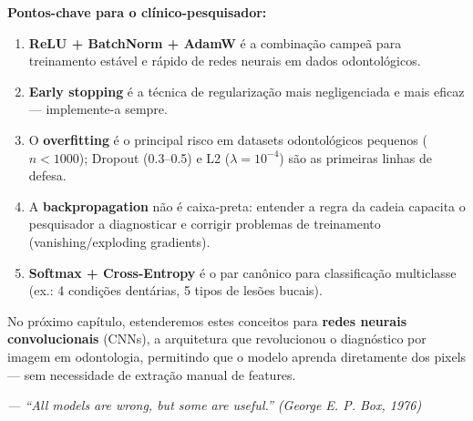 \textbf{Pontos-chave para o clínico-pesquisador:}
\begin{enumerate}
  \item \textbf{ReLU + BatchNorm + AdamW} é a combinação campeã para treinamento
        estável e rápido de redes neurais em dados odontológicos.
  \item \textbf{Early stopping} é a técnica de regularização mais negligenciada
        e mais eficaz --- implemente-a sempre.
  \item O \textbf{overfitting} é o principal risco em datasets odontológicos
        pequenos ($n < 1000$); Dropout (0.3--0.5) e L2 ($\lambda=10^{-4}$)
        são as primeiras linhas de defesa.
  \item A \textbf{backpropagation} não é caixa-preta: entender a regra da cadeia
        capacita o pesquisador a diagnosticar e corrigir problemas de treinamento
        (vanishing/exploding gradients).
  \item \textbf{Softmax + Cross-Entropy} é o par canônico para classificação
        multiclasse (ex.: 4 condições dentárias, 5 tipos de lesões bucais).
\end{enumerate}

No próximo capítulo, estenderemos estes conceitos para \textbf{redes neurais
convolucionais} (CNNs), a arquitetura que revolucionou o diagnóstico por imagem
em odontologia, permitindo que o modelo aprenda diretamente dos pixels --- sem
necessidade de extração manual de features.

\begin{flushright}
\itshape\small
--- ``All models are wrong, but some are useful.'' (George E. P. Box, 1976)
\end{flushright}

